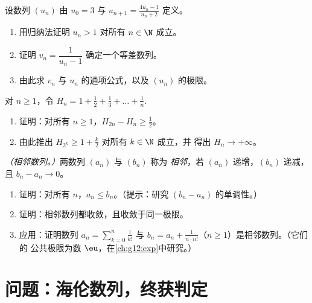\begin{exercise}[$\star\star$]\label{exo:g12:seq:8}
设数列 $(u_n)$ 由 $u_0 = 3$ 与 $u_{n+1} = \frac{4u_n - 1}{u_n + 2}$ 定义。
\begin{enumerate}
  \item 用归纳法证明 $u_n > 1$ 对所有 $n \in \N$ 成立。
  \item 证明 $v_n = \dfrac{1}{u_n - 1}$ 确定一个等差数列。
  \item 由此求 $v_n$ 与 $u_n$ 的通项公式，以及
        $(u_n)$ 的极限。
\end{enumerate}
\end{exercise}

\begin{exercise}[$\star\star\star$]\label{exo:g12:seq:9}
对 $n \geq 1$，令
$H_n = 1 + \frac{1}{2} + \frac{1}{3} + \dots + \frac{1}{n}$.
\begin{enumerate}
  \item 证明：对所有 $n \geq 1$，$H_{2n} - H_n \geq \frac{1}{2}$。
  \item 由此推出 $H_{2^k} \geq 1 + \frac{k}{2}$ 对所有 $k \in \N$ 成立，并
        得出 $H_n \to +\infty$。
\end{enumerate}
\end{exercise}

\begin{exercise}[$\star\star\star$]\label{exo:g12:seq:10}
\emph{（相邻数列。）}两数列 $(a_n)$ 与 $(b_n)$ 称为
\emph{相邻}，若 $(a_n)$ 递增，$(b_n)$ 递减，且
$b_n - a_n \to 0$。
\begin{enumerate}
  \item 证明：对所有 $n$，$a_n \leq b_n$。（提示：研究
        $(b_n - a_n)$ 的单调性。）
  \item 证明：相邻数列都收敛，且收敛于同一极限。
  \item 应用：证明数列
        $a_n = \sum_{k=0}^{n} \frac{1}{k!}$ 与
        $b_n = a_n + \frac{1}{n \cdot n!}$（$n \geq 1$）是相邻数列。（它们的
        公共极限为数 $\eu$，在\cref{ch:g12:exp}中研究。）
\end{enumerate}
\end{exercise}

\section{问题：海伦数列，终获判定}

